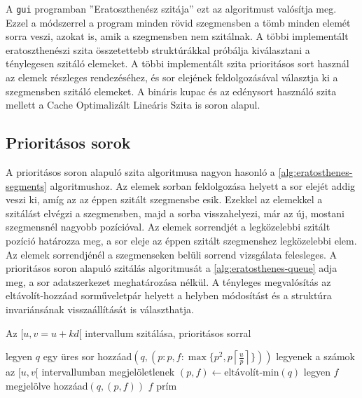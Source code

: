 A \texttt{gui} programban ''Eratoszthenész szitája'' ezt az algoritmust valósítja meg.
Ezzel a módszerrel a program minden rövid szegmensben a tömb minden elemét sorra veszi, azokat is, amik a szegmensben nem szitálnak.
A többi implementált eratoszthenészi szita összetettebb struktúrákkal próbálja kiválasztani a ténylegesen szitáló elemeket.
A többi implementált szita prioritásos sort használ az elemek részleges rendezéséhez, és sor elejének feldolgozásával választja ki a szegmensben szitáló elemeket.
A bináris kupac és az edénysort használó szita mellett a Cache Optimalizált Lineáris Szita is soron alapul.

\subsection{Prioritásos sorok}

A prioritásos soron alapuló szita algoritmusa nagyon hasonló a \ref{alg:eratosthenes-segments} algoritmushoz.
Az elemek sorban feldolgozása helyett a sor elejét addig veszi ki, amíg az az éppen szitált szegmensbe esik.
Ezekkel az elemekkel a szitálást elvégzi a szegmensben, majd a sorba visszahelyezi, már az új, mostani szegmensnél nagyobb pozícióval.
Az elemek sorrendjét a legközelebbi szitált pozíció határozza meg, a sor eleje az éppen szitált szegmenshez legközelebbi elem.
Az elemek sorrendjénél a szegmenseken belüli sorrend vizsgálata felesleges.
A prioritásos soron alapuló szitálás algoritmusát a \ref{alg:eratosthenes-queue} adja meg, a sor adatszerkezet meghatározása nélkül.
A tényleges megvalósítás az eltávolít-hozzáad sorműveletpár helyett a helyben módosítást és a struktúra invariánsának visszaállítását is választhatja.

\begin{algorithm}
\caption{Az $[u, v=u+kd[$ intervallum szitálása, prioritásos sorral}
\label{alg:eratosthenes-queue}
\begin{algorithmic}[1]
\State legyen $q$ egy üres sor
	\State hozzáad$(q, (p: p, f: \max \lbrace p^2, p \left \lceil{\frac{u}{p}}\right \rceil \rbrace ))$
\EndFor
{}
	\State legyenek a számok az $[u, v[$ intervallumban megjelöletlenek
		\State $(p, f) \gets \textrm{eltávolít-min}(q)$
			\State legyen $f$ megjelölve
		\EndFor
		\State hozzáad$(q, (p, f))$
	\EndWhile
	\For{$f \in [u, v[$}
			\State $f$ prím
		\EndIf
	\EndFor
\EndFor
\end{algorithmic}
\end{algorithm}


